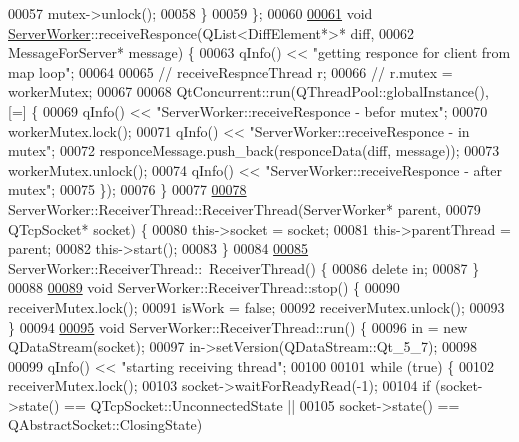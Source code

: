 \begin{DoxyCode}
00057     mutex->unlock();
00058   \}
00059 \};
00060 
\hyperlink{a00185_a2cfa275ffeff3aeee19058e8155763f5}{00061} \textcolor{keywordtype}{void} \hyperlink{a00185_ab80ef665f93d81c71a83aa42f8d888df}{ServerWorker}::receiveResponce(QList<DiffElement*>* diff,
00062                                    MessageForServer* message) \{
00063   qInfo() << \textcolor{stringliteral}{"getting responce for client from map loop"};
00064 
00065   \textcolor{comment}{//  receiveRespnceThread r;}
00066   \textcolor{comment}{//  r.mutex = workerMutex;}
00067 
00068   QtConcurrent::run(QThreadPool::globalInstance(), [=] \{
00069     qInfo() << \textcolor{stringliteral}{"ServerWorker::receiveResponce - befor mutex"};
00070     workerMutex.lock();
00071     qInfo() << \textcolor{stringliteral}{"ServerWorker::receiveResponce - in mutex"};
00072     responceMessage.push\_back(responceData(diff, message));
00073     workerMutex.unlock();
00074     qInfo() << \textcolor{stringliteral}{"ServerWorker::receiveResponce - after mutex"};
00075   \});
00076 \}
00077 
\hyperlink{a00193_a4d4ad81a3aa7b6b71eb8d9345f9b7924}{00078} ServerWorker::ReceiverThread::ReceiverThread(ServerWorker* parent,
00079                                              QTcpSocket* socket) \{
00080   \textcolor{keyword}{this}->socket = socket;
00081   \textcolor{keyword}{this}->parentThread = parent;
00082   \textcolor{keyword}{this}->start();
00083 \}
00084 
\hyperlink{a00193_a301c367fce51a745fef83c7c200f7eeb}{00085} ServerWorker::ReceiverThread::~ReceiverThread() \{
00086   \textcolor{keyword}{delete} in;
00087 \}
00088 
\hyperlink{a00193_ab4b5a368d07b2670c72be1a04404f76d}{00089} \textcolor{keywordtype}{void} ServerWorker::ReceiverThread::stop() \{
00090   receiverMutex.lock();
00091   isWork = \textcolor{keyword}{false};
00092   receiverMutex.unlock();
00093 \}
00094 
\hyperlink{a00193_ac4363547096e15a9a70e588e010855f9}{00095} \textcolor{keywordtype}{void} ServerWorker::ReceiverThread::run() \{
00096   in = \textcolor{keyword}{new} QDataStream(socket);
00097   in->setVersion(QDataStream::Qt\_5\_7);
00098 
00099   qInfo() << \textcolor{stringliteral}{"starting receiving thread"};
00100 
00101   \textcolor{keywordflow}{while} (\textcolor{keyword}{true}) \{
00102     receiverMutex.lock();
00103     socket->waitForReadyRead(-1);
00104     \textcolor{keywordflow}{if} (socket->state() == QTcpSocket::UnconnectedState ||
00105         socket->state() == QAbstractSocket::ClosingState)

\end{DoxyCode}
